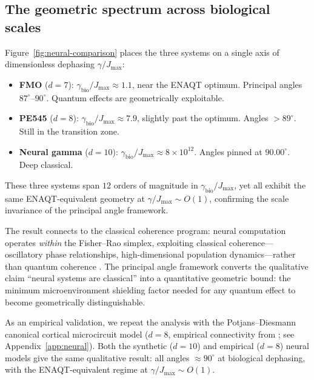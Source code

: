 \documentclass[12pt,a4paper]{article}
\theoremstyle{definition}
\theoremstyle{remark}
\begin{document}
\subsection{The geometric spectrum across biological scales}
\label{sec:cross-scale}

Figure~\ref{fig:neural-comparison} places the three systems on a single axis of dimensionless dephasing $\gamma/J_{\max}$:
\begin{itemize}
\item \textbf{FMO} ($d = 7$): $\gamma_{\mathrm{bio}}/J_{\max} \approx 1.1$, near the ENAQT optimum. Principal angles $87^\circ$--$90^\circ$. Quantum effects are geometrically exploitable.
\item \textbf{PE545} ($d = 8$): $\gamma_{\mathrm{bio}}/J_{\max} \approx 7.9$, slightly past the optimum. Angles $> 89^\circ$. Still in the transition zone.
\item \textbf{Neural gamma} ($d = 10$): $\gamma_{\mathrm{bio}}/J_{\max} \approx 8 \times 10^{12}$. Angles pinned at $90.00^\circ$. Deep classical.
\end{itemize}

These three systems span $12$ orders of magnitude in $\gamma_{\mathrm{bio}}/J_{\max}$, yet all exhibit the same ENAQT-equivalent geometry at $\gamma/J_{\max} \sim O(1)$, confirming the scale invariance of the principal angle framework.

The result connects to the classical coherence program: neural computation operates \emph{within} the Fisher--Rao simplex, exploiting classical coherence---oscillatory phase relationships, high-dimensional population dynamics---rather than quantum coherence \cite{todd2026coherence,todd2026intelligence}. The principal angle framework converts the qualitative claim ``neural systems are classical'' into a quantitative geometric bound: the minimum microenvironment shielding factor needed for any quantum effect to become geometrically distinguishable.

As an empirical validation, we repeat the analysis with the Potjans--Diesmann canonical cortical microcircuit model ($d = 8$, empirical connectivity from \cite{potjans2014cell}; see Appendix~\ref{app:neural}). Both the synthetic ($d = 10$) and empirical ($d = 8$) neural models give the same qualitative result: all angles $\approx 90^\circ$ at biological dephasing, with the ENAQT-equivalent regime at $\gamma/J_{\max} \sim O(1)$.
\end{document}
